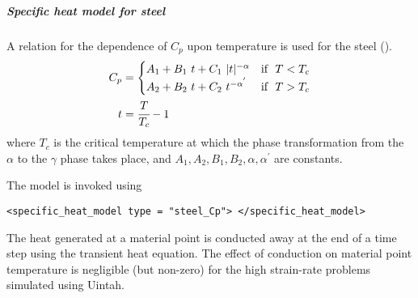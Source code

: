   \subparagraph{Specific heat model for steel}
  A relation for the dependence of $C_p$ upon temperature is
  used for the steel (\cite{Lederman74}).
  \begin{align}
    C_p & = \begin{cases}
            A_1 + B_1~t + C_1~|t|^{-\alpha} & \text{if}~~ T < T_c \\
            A_2 + B_2~t + C_2~t^{-\alpha^{'}} & \text{if}~~ T > T_c 
          \end{cases} \label{eq:CpSteel}\\
    t & = \cfrac{T}{T_c} - 1 
  \end{align}
  where $T_c$ is the critical temperature at which the phase transformation
  from the $\alpha$ to the $\gamma$ phase takes place, and $A_1, A_2, B_1, B_2,
  \alpha, \alpha^{'}$ are constants.

  The model is invoked using
  \begin{Verbatim}[fontsize=\footnotesize]
  <specific_heat_model type = "steel_Cp"> </specific_heat_model>
  \end{Verbatim}

  The heat generated at a material point is conducted away at the end of a
  time step using the transient heat equation.  The effect of conduction on
  material point temperature is negligible (but non-zero) for the high
  strain-rate problems simulated using Uintah.

